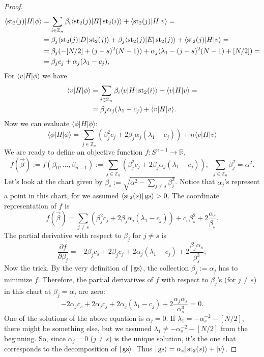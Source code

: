 \begin{proof}
\[\begin{split}
\langle \st_2(j) |H|\phi\rangle& = \sum_{i \in \mathbb Z_n}\beta_i\langle \st_2(j) |H|\st_2(i)\rangle + \langle \st_2(j) | H | v \rangle = \\& = \beta_j \langle \st_2(j) | D|\st_2(j)\rangle + \beta_j \langle \st_2(j)|E|\st_2(j)\rangle + \langle \st_2(j) |H|v \rangle = \\ &= \beta_j(-[N/2] + (j-s)^2(N-1)) +  \alpha_j(\lambda_1 - (j-s)^2(N-1) + [N/2]) = \\ &= \beta_jc_j + \alpha_j(\lambda_1-c_j), %
\end{split}
\]
For $\langle v | H |\phi \rangle$ we have
\[\begin{split}
\langle v | H | \phi \rangle& = \sum_{i \in \mathbb Z_n}\beta_i\langle v | H|\operatorname{st}_2(i)\rangle + \langle v |H|v \rangle = \\ &= \beta_j\alpha_j(\lambda_1 - c_j) + \langle v |H|v \rangle.
\end{split}
\]
Now we can evaluate $\langle \phi | H| \phi \rangle$:
\[
\langle \phi | H| \phi \rangle = \sum_{j \in \mathbb Z_n} \left(\beta_j^2 c_j + 2\beta_j\alpha_j(\lambda_1-c_j) \right) + n\langle v |H|v \rangle 
\]
We are ready to define an objective function $f: S^{n-1} \rightarrow \mathbb R$,
\[
f(\vec{\beta}) := f(\beta_0,\ldots,\beta_{n-1}) := \sum_{j \in \mathbb Z_n} (\beta_j^2 c_j + 2\beta_j\alpha_j(\lambda_1-c_j))
, \ \ \sum_{j\in \mathbb Z_n} \beta_j^2 = \alpha^2.
\]
Let's look at the chart given by $\beta_s := \sqrt{\alpha^2 - \sum_{j \neq s} \beta_j^2}$. Notice that $\alpha_j$'s represent a point in this chart, for we assumed $\langle \operatorname{st}_2(s)|\operatorname{gs} \rangle > 0$. The coordinate representation of $f$ is 
\[
f(\vec{\beta}) = \sum_{j\neq s} (\beta_j^2 c_j + 2\beta_j \alpha_j(\lambda_1 - c_j)) + c_s\beta_s^2 + 2\frac{\alpha_s}{\beta_s}.%
\]
The partial derivative with respect to $\beta_j$ for $j \neq s$ is
\[
\frac{\partial f}{\partial \beta_j} = -2\beta_jc_s + 2\beta_j c_j + 2\alpha_j(\lambda_1-c_j) + 2\frac{\beta_j\alpha_s}{\beta_s^3};
\]
Now the trick. By the very definition of $|\operatorname{gs}\rangle$, the collection $\beta_j := \alpha_j$ has to minimize $f$. Therefore, the partial derivatives of $f$ with respect to $\beta_j$'s (for $j \neq s$) in this chart at $\beta_j = \alpha_j$ are zero:
\[
-2\alpha_jc_s + 2\alpha_j c_j + 2\alpha_j(\lambda_1-c_j) + 2\frac{\alpha_j\alpha_s}{\alpha_s^3} = 0.
\]
One of the solutions of the above equation is $\alpha_j = 0$. If $\lambda_1 = - \alpha_s^{-2} -[N/2]$, there might be something else, but we assumed $\lambda_1 \neq - \alpha_s^{-2}-[N/2]$ from the beginning. So, since $\alpha_j = 0$ ($j \neq s$) is the unique solution, it's the one that corresponds to the decomposition of $|\operatorname{gs} \rangle$. Thus $|\operatorname{gs}\rangle = \alpha_s |\operatorname{st}_2(s)\rangle + |v\rangle$.
\end{proof}

